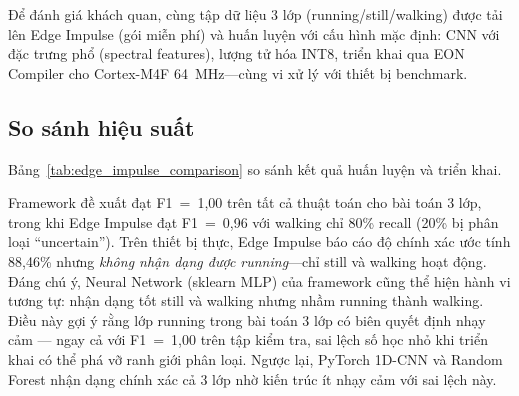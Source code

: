 Để đánh giá khách quan, cùng tập dữ liệu 3 lớp (running/still/walking) được tải lên Edge Impulse (gói miễn phí) và huấn luyện với cấu hình mặc định: CNN với đặc trưng phổ (spectral features), lượng tử hóa INT8, triển khai qua EON Compiler cho Cortex-M4F 64~MHz---cùng vi xử lý với thiết bị benchmark.

\subsection{So sánh hiệu suất}

Bảng~\ref{tab:edge_impulse_comparison} so sánh kết quả huấn luyện và triển khai.

\begin{table}[H]
    \centering
    \caption{So sánh framework đề xuất vs Edge Impulse --- bài toán 3 lớp, cùng tập dữ liệu}
    \label{tab:edge_impulse_comparison}
\end{table}

Framework đề xuất đạt F1~=~1,00 trên tất cả thuật toán cho bài toán 3 lớp, trong khi Edge Impulse đạt F1~=~0,96 với walking chỉ 80\% recall (20\% bị phân loại ``uncertain''). Trên thiết bị thực, Edge Impulse báo cáo độ chính xác ước tính 88,46\% nhưng \textit{không nhận dạng được running}---chỉ still và walking hoạt động. Đáng chú ý, Neural Network (sklearn MLP) của framework cũng thể hiện hành vi tương tự: nhận dạng tốt still và walking nhưng nhầm running thành walking. Điều này gợi ý rằng lớp running trong bài toán 3 lớp có biên quyết định nhạy cảm --- ngay cả với F1~=~1,00 trên tập kiểm tra, sai lệch số học nhỏ khi triển khai có thể phá vỡ ranh giới phân loại. Ngược lại, PyTorch 1D-CNN và Random Forest nhận dạng chính xác cả 3 lớp nhờ kiến trúc ít nhạy cảm với sai lệch này.

